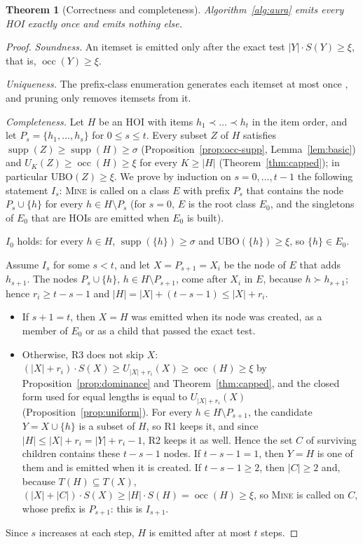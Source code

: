 \documentclass[pdflatex,sn-mathphys,Numbered]{sn-jnl}
\theoremstyle{thmstyleone}
\newtheorem{theorem}{Theorem}
\theoremstyle{thmstyletwo}
\theoremstyle{thmstylethree}
\newcommand{\supp}{\operatorname{supp}}
\newcommand{\socc}{\operatorname{occ}}
\newcommand{\Ubo}{\mathrm{UBO}}
\newcommand{\Ucap}{U}
\begin{document}
\begin{theorem}[Correctness and completeness]\label{thm:correct}
Algorithm~\ref{alg:aura} emits every HOI exactly once and emits nothing else.
\end{theorem}
\begin{proof}
\emph{Soundness.} An itemset is emitted only after the exact test $|Y| \cdot S(Y) \ge \xi$, that is, $\socc(Y) \ge \xi$.

\emph{Uniqueness.} The prefix-class enumeration generates each itemset at most once \cite{zaki2000scalable}, and pruning only removes itemsets from it.

\emph{Completeness.} Let $H$ be an HOI with items $h_1 \prec \dots \prec h_t$ in the item order, and let $P_s = \{h_1, \dots, h_s\}$ for $0 \le s \le t$. Every subset $Z$ of $H$ satisfies $\supp(Z) \ge \supp(H) \ge \sigma$ (Proposition~\ref{prop:occ-supp}, Lemma~\ref{lem:basic}) and $\Ucap_K(Z) \ge \socc(H) \ge \xi$ for every $K \ge |H|$ (Theorem~\ref{thm:capped}); in particular $\Ubo(Z) \ge \xi$. We prove by induction on $s = 0, \dots, t-1$ the following statement $I_s$: \textsc{Mine} is called on a class $E$ with prefix $P_s$ that contains the node $P_s \cup \{h\}$ for every $h \in H \setminus P_s$ (for $s = 0$, $E$ is the root class $E_0$, and the singletons of $E_0$ that are HOIs are emitted when $E_0$ is built).

$I_0$ holds: for every $h \in H$, $\supp(\{h\}) \ge \sigma$ and $\Ubo(\{h\}) \ge \xi$, so $\{h\} \in E_0$.

Assume $I_s$ for some $s < t$, and let $X = P_{s+1} = X_i$ be the node of $E$ that adds $h_{s+1}$. The nodes $P_s \cup \{h\}$, $h \in H \setminus P_{s+1}$, come after $X_i$ in $E$, because $h \succ h_{s+1}$; hence $r_i \ge t - s - 1$ and $|H| = |X| + (t - s - 1) \le |X| + r_i$.
\begin{itemize}
\item If $s + 1 = t$, then $X = H$ was emitted when its node was created, as a member of $E_0$ or as a child that passed the exact test.
\item Otherwise, R3 does not skip $X$: $(|X| + r_i) \cdot S(X) \ge \Ucap_{|X|+r_i}(X) \ge \socc(H) \ge \xi$ by Proposition~\ref{prop:dominance} and Theorem~\ref{thm:capped}, and the closed form used for equal lengths is equal to $\Ucap_{|X|+r_i}(X)$ (Proposition~\ref{prop:uniform}). For every $h \in H \setminus P_{s+1}$, the candidate $Y = X \cup \{h\}$ is a subset of $H$, so R1 keeps it, and since $|H| \le |X| + r_i = |Y| + r_i - 1$, R2 keeps it as well. Hence the set $C$ of surviving children contains these $t - s - 1$ nodes. If $t - s - 1 = 1$, then $Y = H$ is one of them and is emitted when it is created. If $t - s - 1 \ge 2$, then $|C| \ge 2$ and, because $T(H) \subseteq T(X)$, $(|X| + |C|) \cdot S(X) \ge |H| \cdot S(H) = \socc(H) \ge \xi$, so \textsc{Mine} is called on $C$, whose prefix is $P_{s+1}$: this is $I_{s+1}$.
\end{itemize}
Since $s$ increases at each step, $H$ is emitted after at most $t$ steps.
\end{proof}
\end{document}
